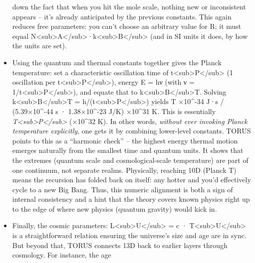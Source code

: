 \documentclass[
]{article}
\begin{document}
\begin{itemize}
  down the fact that when you hit the mole scale, nothing new or
  inconsistent appears -- it's already anticipated by the previous
  constants\hspace{0pt}. This again reduces free parameters: you can't
  choose an arbitrary value for R; it must equal
  N\textless sub\textgreater A\textless/sub\textgreater·k\textless sub\textgreater B\textless/sub\textgreater{}
  (and in SI units it does, by how the units are set).
\item
  Using the quantum and thermal constants together gives the Planck
  temperature: set a characteristic oscillation time of
  t\textless sub\textgreater P\textless/sub\textgreater{} (1 oscillation
  per t\textless sub\textgreater P\textless/sub\textgreater), energy E =
  hν (with ν = 1/t\textless sub\textgreater P\textless/sub\textgreater),
  and equate that to
  k\textless sub\textgreater B\textless/sub\textgreater T. Solving
  k\textless sub\textgreater B\textless/sub\textgreater T =
  h/(t\textless sub\textgreater P\textless/sub\textgreater) yields T ×10\^{}-34 J·s / (5.39×10\^{}-44 s · 1.38×10\^{}-23 J/K) ×10\^{}31 K\hspace{0pt}. This is essentially
  \emph{T\textless sub\textgreater P\textless/sub\textgreater{}} (×10\^{}32 K)\hspace{0pt}. In other words, \emph{without ever
  invoking Planck temperature explicitly}, one gets it by combining
  lower-level constants. TORUS points to this as a ``harmonic check'' --
  the highest energy thermal motion emerges naturally from the smallest
  time and quantum units\hspace{0pt}. It shows that the extremes
  (quantum scale and cosmological-scale temperature) are part of one
  continuum, not separate realms. Physically, reaching 10D (Planck T)
  means the recursion has folded back on itself: any hotter and you'd
  effectively cycle to a new Big Bang. Thus, this numeric alignment is
  both a sign of internal consistency and a hint that the theory covers
  known physics right up to the edge of where new physics (quantum
  gravity) would kick in.
\item
  Finally, the cosmic parameters:
  L\textless sub\textgreater U\textless/sub\textgreater{} = c ·
  T\textless sub\textgreater U\textless/sub\textgreater{} is a
  straightforward relation ensuring the universe's size and age are in
  sync\hspace{0pt}. But beyond that, TORUS connects 13D back to earlier
  layers through cosmology. For instance, the age

\end{itemize}
\end{document}
